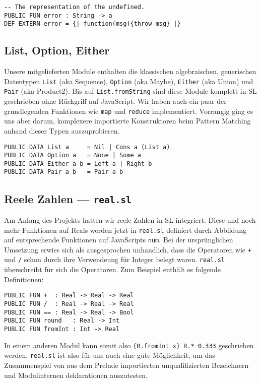 \documentclass{llncs}
\begin{document}
\begin{verbatim}
-- The representation of the undefined.
PUBLIC FUN error : String -> a
DEF EXTERN error = {| function(msg){throw msg} |} 
\end{verbatim}

\subsection{List, Option, Either}

Unsere mitgelieferten Module enthalten die klassischen algebraischen,
generischen Datentypen \verb|List| (aka Sequence), \verb|Option| (aka Maybe),
\verb|Either| (aka Union) und \verb|Pair| (aka Product2).
Bis auf \verb|List.fromString| sind diese Module komplett in SL geschrieben
ohne Rückgriff auf JavaScript. Wir haben auch ein paar der grundlegenden
Funktionen wie \verb|map| und \verb|reduce| implementiert. Vorrangig ging
es uns aber darum, komplexere importierte Konstruktoren beim Pattern Matching
anhand dieser Typen auszuprobieren.

\begin{verbatim}
PUBLIC DATA List a     = Nil | Cons a (List a)
PUBLIC DATA Option a   = None | Some a
PUBLIC DATA Either a b = Left a | Right b
PUBLIC DATA Pair a b   = Pair a b
\end{verbatim}

\subsection{Reele Zahlen --- \texttt{real.sl}}

Am Anfang des Projekts hatten wir reele Zahlen in SL integriert. Diese und
noch mehr Funktionen auf Reals werden jetzt in \verb|real.sl| definiert
durch Abbildung auf entsprechende Funktionen auf JavaScripts \verb|num|.
Bei der ursprünglichen Umsetzung erwies sich als ausgesprochen
unhandlich, dass die Operatoren wie \verb|+| und \verb|/| schon durch ihre
Verwendeung für Integer belegt waren. \verb|real.sl| überschreibt für sich
die Operatoren. Zum Beispiel enthält es folgende Definitionen:

\begin{verbatim}
PUBLIC FUN +  : Real -> Real -> Real
PUBLIC FUN /  : Real -> Real -> Real
PUBLIC FUN == : Real -> Real -> Bool
PUBLIC FUN round   : Real -> Int
PUBLIC FUN fromInt : Int -> Real
\end{verbatim}

In einem anderen Modul kann somit also \verb|(R.fromInt x) R.* 0.333|
geschrieben werden. \verb|real.sl| ist also für uns auch eine gute
Möglichkeit, um das Zusammenspiel von aus dem Prelude importierten
unqualifizierten Bezeichnern und Modulinternen deklarationen auszutesten.
\end{document}
